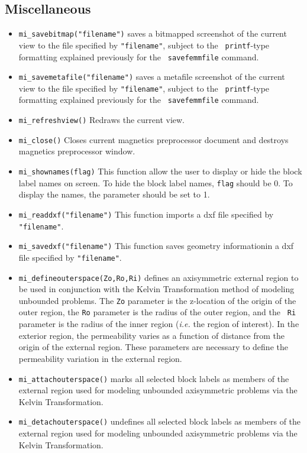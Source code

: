 \subsection{Miscellaneous}
\begin{itemize}
\item{\tt mi\_savebitmap("filename")} saves a bitmapped screenshot of the current
view to the file specified by {\tt "filename"}, subject to the {\tt
printf}-type formatting explained previously for the {\tt
savefemmfile} command.
\item{\tt mi\_savemetafile("filename")} saves a metafile screenshot of the current
view to the file specified by {\tt "filename"}, subject to the {\tt
printf}-type formatting explained previously for the {\tt
savefemmfile} command.
\item{\tt mi\_refreshview()} Redraws the current view.
\item{\tt mi\_close()} Closes current magnetics preprocessor
document and destroys magnetics preprocessor window.
\item{\tt mi\_shownames(flag)} This function allow the user to display or hide the block label
names on screen.  To hide the block label names, {\tt flag} should be 0.  To display the
names, the parameter should be set to 1.
\item{\tt mi\_readdxf("filename")} This function imports a dxf file specified by {\tt "filename"}.
\item{\tt mi\_savedxf("filename")} This function saves geometry informationin a dxf file specified by {\tt "filename"}.
\item{\tt mi\_defineouterspace(Zo,Ro,Ri)} defines
an axisymmetric external region to be used in conjunction with the
Kelvin Transformation method of modeling unbounded problems.  The
{\tt Zo} parameter is the z-location of the origin of the outer region,
the {\tt Ro} parameter is the radius of the outer region, and the {\tt
Ri} parameter is the radius of the inner region ({\em i.e.} the region of
interest). In the exterior region, the permeability varies as a function of
distance from the origin of the external region.  These parameters
are necessary to define the permeability variation in the external
region.
\item{\tt mi\_attachouterspace()} marks all
selected block labels as members of the external region used for
modeling unbounded axisymmetric problems via the Kelvin
Transformation.
\item{\tt mi\_detachouterspace()} undefines all selected block labels
as members of the external region used for modeling unbounded axisymmetric
problems via the Kelvin Transformation.


\end{itemize}
